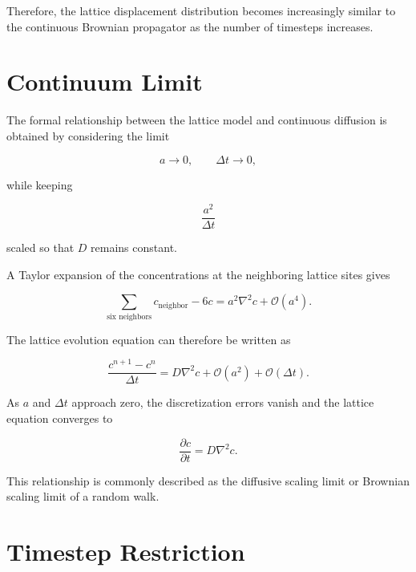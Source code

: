 \documentclass[11pt]{article}
\begin{document}
Therefore, the lattice displacement distribution becomes increasingly similar to the continuous Brownian propagator as the number of timesteps increases.

\section{Continuum Limit}

The formal relationship between the lattice model and continuous diffusion is obtained by considering the limit

\begin{equation}
    a\rightarrow0,
    \qquad
    \Delta t\rightarrow0,
\end{equation}

while keeping

\begin{equation}
    \frac{a^2}{\Delta t}
\end{equation}

scaled so that \(D\) remains constant.

A Taylor expansion of the concentrations at the neighboring lattice sites gives

\begin{equation}
    \sum_{\text{six neighbors}}
    c_{\mathrm{neighbor}}
    -
    6c
    =
    a^2\nabla^2c
    +
    \mathcal{O}(a^4).
\end{equation}

The lattice evolution equation can therefore be written as

\begin{equation}
    \frac{c^{n+1}-c^n}{\Delta t}
    =
    D\nabla^2c
    +
    \mathcal{O}(a^2)
    +
    \mathcal{O}(\Delta t).
\end{equation}

As \(a\) and \(\Delta t\) approach zero, the discretization errors vanish and the lattice equation converges to

\begin{equation}
    \frac{\partial c}{\partial t}
    =
    D\nabla^2c.
\end{equation}

This relationship is commonly described as the diffusive scaling limit or Brownian scaling limit of a random walk.

\section{Timestep Restriction}
\end{document}
